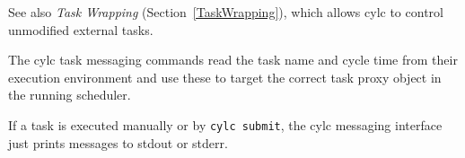 
See also {\em Task Wrapping} (Section~\ref{TaskWrapping}), which allows
cylc to control unmodified external tasks.

\lstset{language=bash}

The cylc task messaging commands read the task name and cycle time from
their execution environment and use these to target the correct task
proxy object in the running scheduler.

If a task is executed manually or by \lstinline=cylc submit=, the cylc
messaging interface just prints messages to stdout or stderr.
